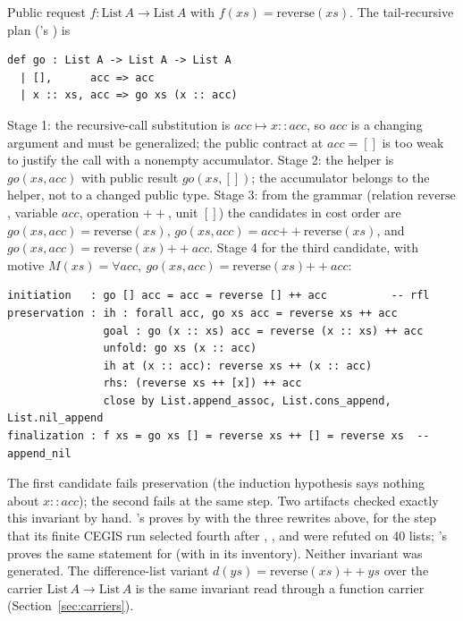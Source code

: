 Public request $f : \mathrm{List}\,A \to \mathrm{List}\,A$ with $f(xs) = \mathrm{reverse}(xs)$. The tail-recursive plan ('s ) is
\begin{lstlisting}
def go : List A -> List A -> List A
  | [],      acc => acc
  | x :: xs, acc => go xs (x :: acc)
\end{lstlisting}
Stage 1: the recursive-call substitution is $acc \mapsto x{::}acc$, so $acc$ is a changing argument and must be generalized; the public contract at $acc = []$ is too weak to justify the call with a nonempty accumulator. Stage 2: the helper is $go(xs, acc)$ with public result $go(xs, [])$; the accumulator belongs to the helper, not to a changed public type. Stage 3: from the grammar (relation $\mathrm{reverse}$, variable $acc$, operation $\mathbin{+\!\!+}$, unit $[]$) the candidates in cost order are $go(xs,acc) = \mathrm{reverse}(xs)$, $go(xs,acc) = acc \mathbin{+\!\!+} \mathrm{reverse}(xs)$, and $go(xs,acc) = \mathrm{reverse}(xs) \mathbin{+\!\!+} acc$. Stage 4 for the third candidate, with motive $M(xs) = \forall acc,\ go(xs,acc) = \mathrm{reverse}(xs) \mathbin{+\!\!+} acc$:
\begin{lstlisting}
initiation   : go [] acc = acc = reverse [] ++ acc          -- rfl
preservation : ih : forall acc, go xs acc = reverse xs ++ acc
               goal : go (x :: xs) acc = reverse (x :: xs) ++ acc
               unfold: go xs (x :: acc)
               ih at (x :: acc): reverse xs ++ (x :: acc)
               rhs: (reverse xs ++ [x]) ++ acc
               close by List.append_assoc, List.cons_append, List.nil_append
finalization : f xs = go xs [] = reverse xs ++ [] = reverse xs  -- append_nil
\end{lstlisting}
The first candidate fails preservation (the induction hypothesis says nothing about $x{::}acc$); the second fails at the same step. Two artifacts checked exactly this invariant by hand. 's  proves  by  with the three rewrites above, for the step  that its finite CEGIS run selected fourth after , \code{[x]}, and  were refuted on 40 lists; 's  proves the same statement for  (with  in its inventory). Neither invariant was generated. The difference-list variant $d(ys) = \mathrm{reverse}(xs) \mathbin{+\!\!+} ys$ over the carrier $\mathrm{List}\,A \to \mathrm{List}\,A$ is the same invariant read through a function carrier (Section~\ref{sec:carriers}).

